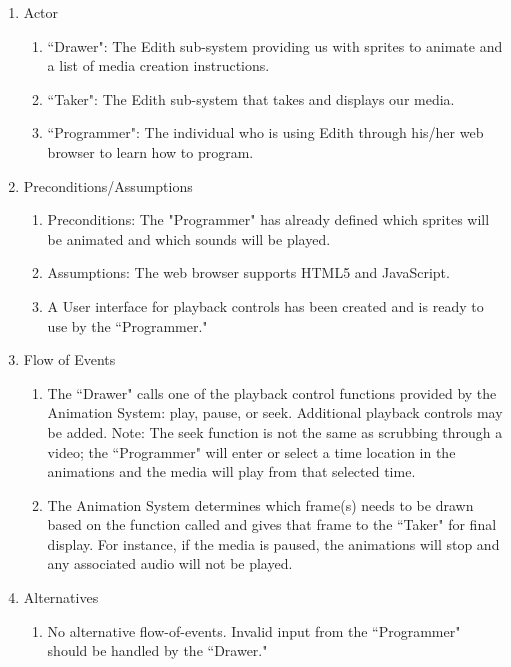 \documentclass[12pt]{article}
\begin{document}
\begin{enumerate}
  \item Actor
  \begin{enumerate}
      \item ``Drawer": The Edith sub-system providing us with sprites to animate and a list of media creation instructions.
       \item ``Taker": The Edith sub-system that takes and displays our media.
       \item ``Programmer": The individual who is using Edith through his/her web browser to learn how to program.
  \end{enumerate}
  \item Preconditions/Assumptions
  \begin{enumerate}
       \item Preconditions: The "Programmer" has already defined which sprites will be animated and which sounds will be played.
       \item Assumptions: The web browser supports HTML5 and JavaScript.
       \item A User interface for playback controls has been created and is ready to use by the ``Programmer."
  \end{enumerate}
  \item Flow of Events
  \begin{enumerate}
      \item The ``Drawer" calls one of the playback control functions provided by the Animation System: play, pause, or seek. Additional playback controls may be added. Note: The seek function is not the same as scrubbing through a video; the ``Programmer" will enter or select a time location in the animations and the media will play from that selected time.
      \item The Animation System determines which frame(s) needs to be drawn based on the function called and gives that frame to the ``Taker" for final display. For instance, if the media is paused, the animations will stop and any associated audio will not be played.
  \end{enumerate}
  \item Alternatives
  \begin{enumerate}
        \item No alternative flow-of-events. Invalid input from the ``Programmer" should be handled by the ``Drawer."
  \end{enumerate}
\end{enumerate}
	
\end{document}
